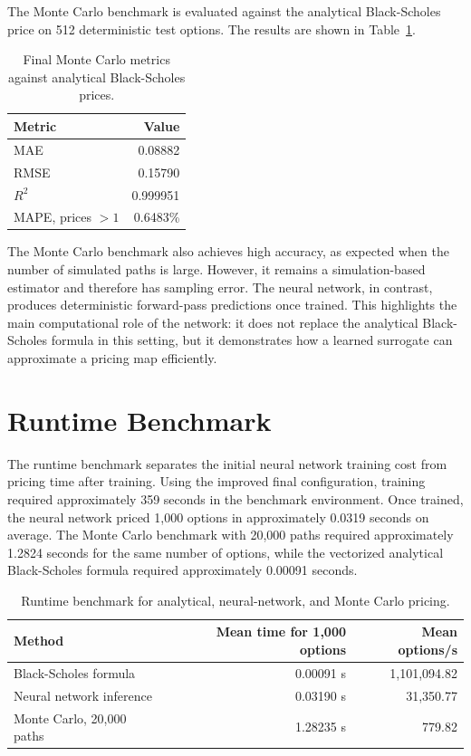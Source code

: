 The Monte Carlo benchmark is evaluated against the analytical Black-Scholes price on 512 deterministic test options.
The results are shown in Table~\ref{tab:mc-final-metrics}.

\begin{table}[H]
    \centering
    \begin{tabular}{lr}
        \toprule
        Metric & Value \\
        \midrule
        MAE & 0.08882 \\
        RMSE & 0.15790 \\
        $R^2$ & 0.999951 \\
        MAPE, prices $> 1$ & 0.6483\% \\
        \bottomrule
    \end{tabular}
    \caption{Final Monte Carlo metrics against analytical Black-Scholes prices.}
    \label{tab:mc-final-metrics}
\end{table}

The Monte Carlo benchmark also achieves high accuracy, as expected when the number of simulated paths is large.
However, it remains a simulation-based estimator and therefore has sampling error.
The neural network, in contrast, produces deterministic forward-pass predictions once trained.
This highlights the main computational role of the network: it does not replace the analytical Black-Scholes formula in this setting, but it demonstrates how a learned surrogate can approximate a pricing map efficiently.

\section{Runtime Benchmark}

The runtime benchmark separates the initial neural network training cost from pricing time after training.
Using the improved final configuration, training required approximately 359 seconds in the benchmark environment.
Once trained, the neural network priced 1,000 options in approximately 0.0319 seconds on average.
The Monte Carlo benchmark with 20,000 paths required approximately 1.2824 seconds for the same number of options, while the vectorized analytical Black-Scholes formula required approximately 0.00091 seconds.

\begin{table}[H]
    \centering
    \begin{tabular}{lrr}
        \toprule
        Method & Mean time for 1,000 options & Mean options/s \\
        \midrule
        Black-Scholes formula & 0.00091 s & 1,101,094.82 \\
        Neural network inference & 0.03190 s & 31,350.77 \\
        Monte Carlo, 20,000 paths & 1.28235 s & 779.82 \\
        \bottomrule
    \end{tabular}
    \caption{Runtime benchmark for analytical, neural-network, and Monte Carlo pricing.}
    \label{tab:runtime-benchmark}
\end{table}

